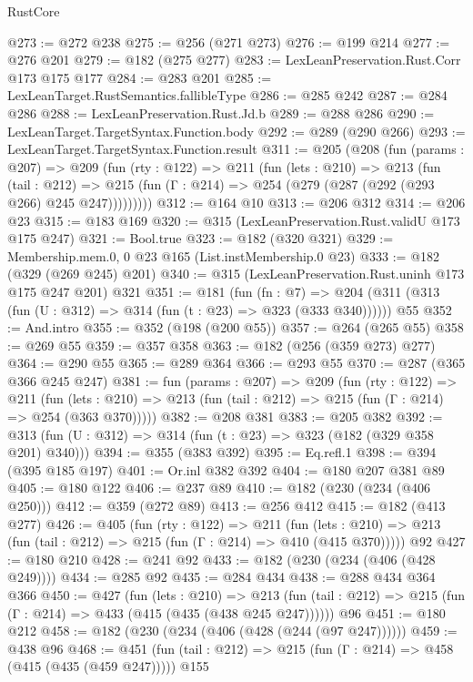 \begin{lexlean}{RustCore}
\begin{coremodule}
@273 := @272 @238
@275 := @256 (@271 @273)
@276 := @199 @214
@277 := @276 @201
@279 := @182 (@275 @277)
@283 := LexLeanPreservation.Rust.Corr @173 @175 @177
@284 := @283 @201
@285 := LexLeanTarget.RustSemantics.fallibleType
@286 := @285 @242
@287 := @284 @286
@288 := LexLeanPreservation.Rust.Jd.b
@289 := @288 @286
@290 := LexLeanTarget.TargetSyntax.Function.body
@292 := @289 (@290 @266)
@293 := LexLeanTarget.TargetSyntax.Function.result
@311 := @205
    (@208
      (fun (params : @207) =>
      @209
        (fun (rty : @122) =>
        @211
          (fun (lets : @210) =>
          @213
            (fun (tail : @212) =>
            @215 (fun (Γ : @214) => @254 (@279 (@287 (@292 (@293 @266) @245 @247)))))))))
@312 := @164 @10
@313 := @206 @312
@314 := @206 @23
@315 := @183 @169
@320 := @315 (LexLeanPreservation.Rust.validU @173 @175 @247)
@321 := Bool.true
@323 := @182 (@320 @321)
@329 := Membership.mem.{0, 0} @23 @165 (List.instMembership.{0} @23)
@333 := @182 (@329 (@269 @245) @201)
@340 := @315 (LexLeanPreservation.Rust.uninh @173 @175 @247 @201) @321
@351 := @181
    (fun (fn : @7) =>
    @204 (@311 (@313 (fun (U : @312) => @314 (fun (t : @23) => @323 (@333 @340))))))
    @55
@352 := And.intro
@355 := @352 (@198 (@200 @55))
@357 := @264 (@265 @55)
@358 := @269 @55
@359 := @357 @358
@363 := @182 (@256 (@359 @273) @277)
@364 := @290 @55
@365 := @289 @364
@366 := @293 @55
@370 := @287 (@365 @366 @245 @247)
@381 := fun (params : @207) =>
  @209
    (fun (rty : @122) =>
    @211
      (fun (lets : @210) => @213 (fun (tail : @212) => @215 (fun (Γ : @214) => @254 (@363 @370)))))
@382 := @208 @381
@383 := @205 @382
@392 := @313 (fun (U : @312) => @314 (fun (t : @23) => @323 (@182 (@329 @358 @201) @340)))
@394 := @355 (@383 @392)
@395 := Eq.refl.{1}
@398 := @394 (@395 @185 @197)
@401 := Or.inl @382 @392
@404 := @180 @207 @381 @89
@405 := @180 @122
@406 := @237 @89
@410 := @182 (@230 (@234 (@406 @250)))
@412 := @359 (@272 @89)
@413 := @256 @412
@415 := @182 (@413 @277)
@426 := @405
    (fun (rty : @122) =>
    @211
      (fun (lets : @210) => @213 (fun (tail : @212) => @215 (fun (Γ : @214) => @410 (@415 @370)))))
    @92
@427 := @180 @210
@428 := @241 @92
@433 := @182 (@230 (@234 (@406 (@428 @249))))
@434 := @285 @92
@435 := @284 @434
@438 := @288 @434 @364 @366
@450 := @427
    (fun (lets : @210) =>
    @213 (fun (tail : @212) => @215 (fun (Γ : @214) => @433 (@415 (@435 (@438 @245 @247))))))
    @96
@451 := @180 @212
@458 := @182 (@230 (@234 (@406 (@428 (@244 (@97 @247))))))
@459 := @438 @96
@468 := @451 (fun (tail : @212) => @215 (fun (Γ : @214) => @458 (@415 (@435 (@459 @247))))) @155

\end{coremodule}
\end{lexlean}
